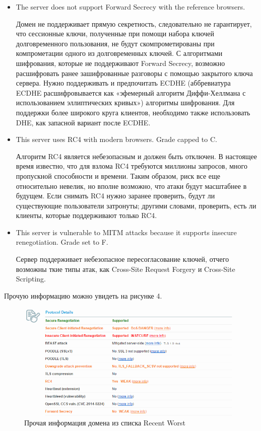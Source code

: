 \documentclass[11pt, a4paper]{article}		%
\begin{document}
\begin{itemize}

\item The server does not support Forward Secrecy with the reference browsers.

Домен не поддерживает прямую секретность, следовательно не гарантирует, что сессионные ключи, полученные при помощи набора ключей долговременного пользования, не будут скомпрометированы при компрометации одного из долговременных ключей.
С алгоритмами шифрования, которые не поддерживают Forward Secrecy, возможно расшифровать ранее зашифрованные разговоры с помощью закрытого ключа сервера. Нужно поддерживать и предпочитать ECDHE (аббревиатура ECDHE расшифровывается как «эфемерный алгоритм Диффи-Хеллмана с использованием эллиптических кривых») алгоритмы шифрования. Для поддержки более широкого круга клиентов, необходимо также использовать DHE, как запасной вариант после ECDHE.

\item This server uses RC4 with modern browsers. Grade capped to C.

Алгоритм RC4 является небезопасным и должен быть отключен. В настоящее время известно, что для взлома RC4 требуются миллионы запросов, много пропускной способности и времени. Таким образом, риск все еще относительно невелик, но вполне возможно, что атаки будут масштабнее в будущем. Если снимать RC4 нужно заранее проверить, будут ли существующие пользователи затронуты; другими словами, проверить, есть ли клиенты, которые поддерживают только RC4.

\item This server is vulnerable to MITM attacks because it supports insecure renegotiation. Grade set to F.

Сервер поддерживает небезопасное пересогласование ключей, отчего возможны ткие типы атак, как Cross-Site Request Forgery и Cross-Site Scripting.

\end{itemize}

Прочую информацию можно увидеть на рисунке 4.

\begin{figure}[h!]
\centering
\includegraphics[scale=0.8]{res/info_worst_domain}
\caption{Прочая информация домена из списка Recent Worst}
\end{figure}
\end{document}
